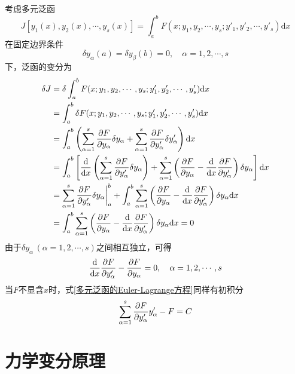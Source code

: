 考虑多元泛函
\begin{equation*}
	J[y_1(x),y_2(x),\cdots,y_s(x)] = \int_a^b F(x;y_1,y_2,\cdots,y_s;y'_1,y'_2,\cdots,y'_s) \mathrm{d} x
\end{equation*}
在固定边界条件
\begin{equation*}
	\delta y_\alpha(a) = \delta y_\beta(b) = 0,\quad \alpha = 1,2,\cdots,s
\end{equation*}
下，泛函的变分为
\begin{align*}
	\delta J & = \delta \int_a^b F(x;y_1,y_2,\cdots,y_s;y'_1,y'_2,\cdots,y'_s) \mathrm{d} x \\
	& = \int_a^b \delta F(x;y_1,y_2,\cdots,y_s;y'_1,y'_2,\cdots,y'_s) \mathrm{d} x \\
	& = \int_a^b \left(\sum_{\alpha=1}^s \frac{\partial F}{\partial y_\alpha} \delta y_\alpha + \sum_{\alpha=1}^s \frac{\partial F}{\partial y'_\alpha} \delta y'_\alpha\right) \mathrm{d} x \\
	& = \int_a^b \left[\frac{\mathrm{d}}{\mathrm{d} x} \left(\sum_{\alpha=1}^s \frac{\partial F}{\partial y'_\alpha} \delta y_\alpha\right) + \sum_{\alpha=1}^s \left(\frac{\partial F}{\partial y_\alpha} - \frac{\mathrm{d}}{\mathrm{d} x} \frac{\partial F}{\partial y'_\alpha} \right) \delta y_\alpha\right] \mathrm{d} x \\
	& = \sum_{\alpha=1}^s \frac{\partial F}{\partial y'_\alpha} \delta y_\alpha \bigg|_a^b + \int_a^b \sum_{\alpha=1}^s \left(\frac{\partial F}{\partial y_\alpha} - \frac{\mathrm{d}}{\mathrm{d} x} \frac{\partial F}{\partial y'_\alpha} \right) \delta y_\alpha \mathrm{d} x \\
	& = \int_a^b \sum_{\alpha=1}^s \left(\frac{\partial F}{\partial y_\alpha} - \frac{\mathrm{d}}{\mathrm{d} x} \frac{\partial F}{\partial y'_\alpha} \right) \delta y_\alpha \mathrm{d} x = 0
\end{align*}
由于$\delta y_\alpha\,(\alpha=1,2,\cdots,s)$之间相互独立，可得
\begin{equation}
	\frac{\mathrm{d}}{\mathrm{d} x} \frac{\partial F}{\partial y'_\alpha} - \frac{\partial F}{\partial y_\alpha} = 0,\quad \alpha = 1,2,\cdots,s
	\label{多元泛函的Euler-Lagrange方程}
\end{equation}
当$F$不显含$x$时，式\eqref{多元泛函的Euler-Lagrange方程}同样有初积分
\begin{equation*}
	\sum_{\alpha=1}^s \frac{\partial F}{\partial y'_\alpha} y'_\alpha - F = C
\end{equation*}

\section{力学变分原理}

